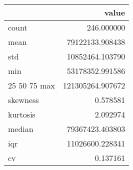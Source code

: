 \begin{tabular}{lr}
\toprule
 & value \\
\midrule
count & 246.000000 \\
mean & 79122133.908438 \\
std & 10852464.103790 \\
min & 53178352.991586 \\
25%
50%
75%
max & 121305264.907672 \\
skewness & 0.578581 \\
kurtosis & 2.092974 \\
median & 79367423.403803 \\
iqr & 11026600.228341 \\
cv & 0.137161 \\
\bottomrule
\end{tabular}
